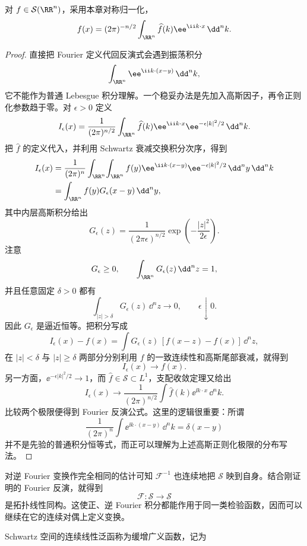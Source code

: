 \begin{theorem}
对 $f\in\mathcal S(\RR^n)$，采用本章对称归一化，
\[
f(x)=(2\pi)^{-n/2}\int_{\RR^n}\widehat f(k)\ee^{\ii k\cdot x}\,\dd^n k.
\]
\end{theorem}
\begin{proof}
直接把 Fourier 定义代回反演式会遇到振荡积分
\[
\int_{\RR^n}\ee^{\ii k\cdot(x-y)}\,\dd^n k,
\]
它不能作为普通 Lebesgue 积分理解。一个稳妥办法是先加入高斯因子，再令正则化参数趋于零。对 $\epsilon>0$ 定义
\[
I_\epsilon(x)
=\frac1{(2\pi)^{n/2}}
\int_{\RR^n}
\widehat f(k)\ee^{\ii k\cdot x}\ee^{-\epsilon|k|^2/2}\,\dd^n k.
\]
把 $\widehat f$ 的定义代入，并利用 Schwartz 衰减交换积分次序，得到
\[
\begin{aligned}
I_\epsilon(x)
&=\frac1{(2\pi)^n}
\int_{\RR^n}\!\int_{\RR^n}
 f(y)\ee^{\ii k\cdot(x-y)}\ee^{-\epsilon|k|^2/2}
\,\dd^n y\,\dd^n k\\
&=\int_{\RR^n}f(y)G_\epsilon(x-y)\,\dd^n y,
\end{aligned}
\]
其中内层高斯积分给出
\begin{equation*}G_\epsilon(z)
=\frac1{(2\pi\epsilon)^{n/2}}
\exp\!\left(-\frac{|z|^2}{2\epsilon}\right).\end{equation*}
注意
\[
G_\epsilon\ge0,
\qquad
\int_{\RR^n}G_\epsilon(z)\,\dd^n z=1,
\]
并且任意固定 $\delta>0$ 都有
\[
\int_{|z|>\delta}G_\epsilon(z)\,\dd^n z\longrightarrow0,
\qquad \epsilon\downarrow0.
\]
因此 $G_\epsilon$ 是逼近恒等。把积分写成
\[
I_\epsilon(x)-f(x)
=\int G_\epsilon(z)\,[f(x-z)-f(x)]\,\dd^n z,
\]
在 $|z|<\delta$ 与 $|z|\ge\delta$ 两部分分别利用 $f$ 的一致连续性和高斯尾部衰减，就得到
\[
I_\epsilon(x)\longrightarrow f(x).
\]
另一方面，$\ee^{-\epsilon|k|^2/2}\to1$，而 $\widehat f\in\mathcal S\subset L^1$，支配收敛定理又给出
\[
I_\epsilon(x)
\longrightarrow
\frac1{(2\pi)^{n/2}}
\int\widehat f(k)\ee^{\ii k\cdot x}\,\dd^n k.
\]
比较两个极限便得到 Fourier 反演公式。这里的逻辑很重要：所谓
\[
\frac1{(2\pi)^n}\int \ee^{\ii k\cdot(x-y)}\,\dd^n k
=\delta(x-y)
\]
并不是先验的普通积分恒等式，而正可以理解为上述高斯正则化极限的分布写法。

\end{proof}

对逆 Fourier 变换作完全相同的估计可知 $\mathcal F^{-1}$ 也连续地把 $\mathcal S$ 映到自身。结合刚证明的 Fourier 反演，就得到
\[
\mathcal F:\mathcal S\longrightarrow\mathcal S
\]
是拓扑线性同构。这使正、逆 Fourier 积分都能作用于同一类检验函数，因而可以继续在它的连续对偶上定义变换。

Schwartz 空间的连续线性泛函称为缓增广义函数，记为

